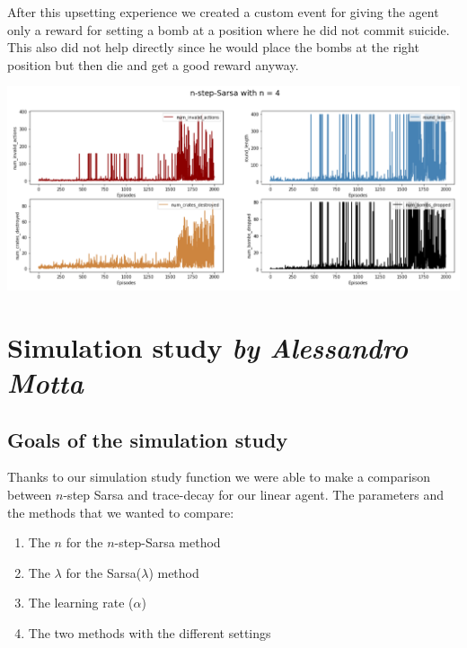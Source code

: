 After this upsetting experience we created a custom event for giving the agent only a reward for setting a bomb at a position where he did not commit suicide. This also did not help directly since he would place the bombs at the right position but then die and get a good reward anyway.
\begin{center}
\includegraphics[scale=0.22]{graphics/plot06.png}
\end{center}

\section[Simulation study]{Simulation study \hfill \small \normalfont\textit{by Alessandro Motta}}

\subsection{Goals of the simulation study}
Thanks to our simulation study function we were able to make a comparison between $n$-step Sarsa and trace-decay for our linear agent. The parameters and the methods that we wanted to compare:
\begin{enumerate}
\item The $n$ for the $n$-step-Sarsa method
\item The $\lambda$ for the Sarsa($\lambda$) method
\item The learning rate ($\alpha$) 
\item The two methods with the different settings
\end{enumerate}






